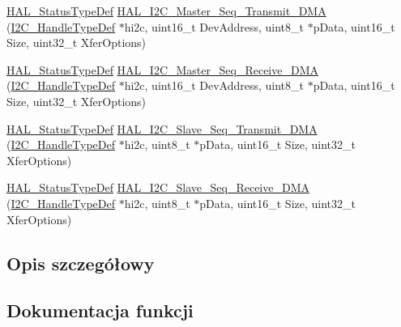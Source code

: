\begin{DoxyCompactItemize}
\item 
\hyperlink{stm32f4xx__hal__def_8h_a63c0679d1cb8b8c684fbb0632743478f}{H\+A\+L\+\_\+\+Status\+Type\+Def} \hyperlink{group___i2_c___exported___functions___group2_gace04b5c76cbe9b8f2293199df5cbebe7}{H\+A\+L\+\_\+\+I2\+C\+\_\+\+Master\+\_\+\+Seq\+\_\+\+Transmit\+\_\+\+D\+MA} (\hyperlink{group___i2_c__handle___structure__definition_ga68e9f45c2fd2161fb827ccdeabb55ea5}{I2\+C\+\_\+\+Handle\+Type\+Def} $\ast$hi2c, uint16\+\_\+t Dev\+Address, uint8\+\_\+t $\ast$p\+Data, uint16\+\_\+t Size, uint32\+\_\+t Xfer\+Options)
\item 
\hyperlink{stm32f4xx__hal__def_8h_a63c0679d1cb8b8c684fbb0632743478f}{H\+A\+L\+\_\+\+Status\+Type\+Def} \hyperlink{group___i2_c___exported___functions___group2_ga83c1c311ce7822081cfca9aeef9ad632}{H\+A\+L\+\_\+\+I2\+C\+\_\+\+Master\+\_\+\+Seq\+\_\+\+Receive\+\_\+\+D\+MA} (\hyperlink{group___i2_c__handle___structure__definition_ga68e9f45c2fd2161fb827ccdeabb55ea5}{I2\+C\+\_\+\+Handle\+Type\+Def} $\ast$hi2c, uint16\+\_\+t Dev\+Address, uint8\+\_\+t $\ast$p\+Data, uint16\+\_\+t Size, uint32\+\_\+t Xfer\+Options)
\item 
\hyperlink{stm32f4xx__hal__def_8h_a63c0679d1cb8b8c684fbb0632743478f}{H\+A\+L\+\_\+\+Status\+Type\+Def} \hyperlink{group___i2_c___exported___functions___group2_ga105b8f6d6d7310e2d9bc170e8ed412ae}{H\+A\+L\+\_\+\+I2\+C\+\_\+\+Slave\+\_\+\+Seq\+\_\+\+Transmit\+\_\+\+D\+MA} (\hyperlink{group___i2_c__handle___structure__definition_ga68e9f45c2fd2161fb827ccdeabb55ea5}{I2\+C\+\_\+\+Handle\+Type\+Def} $\ast$hi2c, uint8\+\_\+t $\ast$p\+Data, uint16\+\_\+t Size, uint32\+\_\+t Xfer\+Options)
\item 
\hyperlink{stm32f4xx__hal__def_8h_a63c0679d1cb8b8c684fbb0632743478f}{H\+A\+L\+\_\+\+Status\+Type\+Def} \hyperlink{group___i2_c___exported___functions___group2_gaeb0f79e15c8dab0d370b3fb48ca592b7}{H\+A\+L\+\_\+\+I2\+C\+\_\+\+Slave\+\_\+\+Seq\+\_\+\+Receive\+\_\+\+D\+MA} (\hyperlink{group___i2_c__handle___structure__definition_ga68e9f45c2fd2161fb827ccdeabb55ea5}{I2\+C\+\_\+\+Handle\+Type\+Def} $\ast$hi2c, uint8\+\_\+t $\ast$p\+Data, uint16\+\_\+t Size, uint32\+\_\+t Xfer\+Options)
\end{DoxyCompactItemize}


\subsection{Opis szczegółowy}


\subsection{Dokumentacja funkcji}
\mbox{\label{group___i2_c___exported___functions___group2_gafd49a2b08bc6e30989c420a9c679b65e}} 
